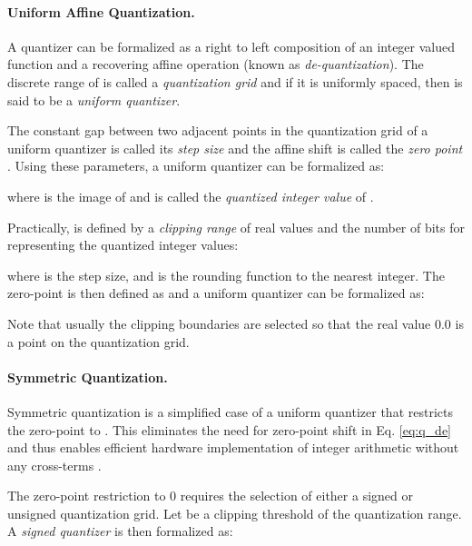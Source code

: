 \documentclass{article}
\begin{document}
\paragraph{Uniform Affine Quantization.}



A quantizer can be formalized as a right to left composition  of an integer valued function  and a recovering affine operation  (known as \textit{de-quantization}). The discrete range of  is called a \textit{quantization grid} and if it is uniformly spaced, then  is said to be a \textit{uniform quantizer}. 

The constant gap between two adjacent points in the quantization grid of a uniform quantizer is called its \textit{step size} and the affine shift is called the \textit{zero point} . 
Using these parameters, a uniform quantizer can be formalized as:


 where  is the image of  and is called the \textit{quantized integer value} of .
 
Practically,  is defined by a \textit{clipping range} of real values  and the number of bits  for representing the quantized integer values:


where  is the step size,  and  is the rounding function to the nearest integer. The zero-point is then defined as  and a uniform quantizer can be formalized as:




Note that usually the clipping boundaries  are selected so that the real value 0.0 is a point on the quantization grid. 






\paragraph{Symmetric Quantization.} 

Symmetric quantization is a simplified case of a uniform quantizer that restricts the zero-point to . This eliminates the need for zero-point shift in Eq. \ref{eq:q_de} and thus enables efficient hardware implementation of integer arithmetic without any cross-terms \nolinebreak \cite{jain2019trained}.

The zero-point restriction to 0 requires the selection of either a signed or unsigned quantization grid. Let  be a clipping threshold of the quantization range. 
A \textit{signed quantizer} is then formalized as: 
\end{document}
